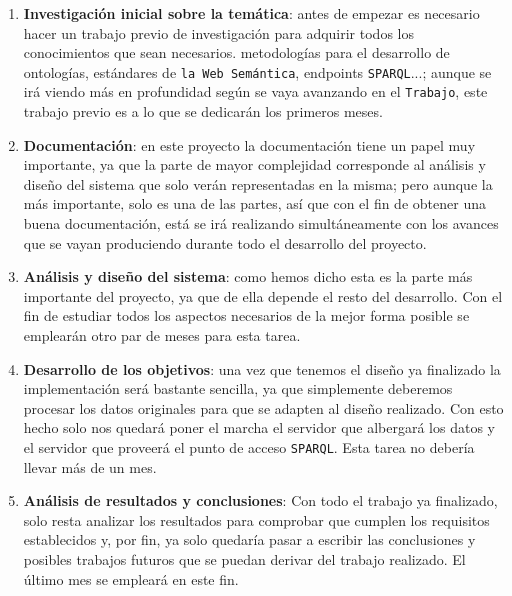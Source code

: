\begin{enumerate}
	\item \textbf{Investigación inicial sobre la temática}: antes de empezar es necesario hacer un trabajo previo de investigación para adquirir todos los conocimientos que sean necesarios. metodologías para el desarrollo de ontologías, estándares de {\tt la Web Semántica}, endpoints {\tt SPARQL}...; aunque se irá viendo más en profundidad según se vaya avanzando en el {\tt Trabajo}, este trabajo previo es a lo que se dedicarán los primeros meses.
	\item \textbf{Documentación}: en este proyecto la documentación tiene un papel muy importante, ya que la parte de mayor complejidad corresponde al análisis y diseño del sistema que solo verán representadas en la misma; pero aunque la más importante, solo es una de las partes, así que con el fin de obtener una buena documentación, está se irá realizando simultáneamente con los avances que se vayan produciendo durante todo el desarrollo del proyecto.
	\item \textbf{Análisis y diseño del sistema}: como hemos dicho esta es la parte más importante del proyecto, ya que de ella depende el resto del desarrollo. Con el fin de estudiar todos los aspectos necesarios de la mejor forma posible se emplearán otro par de meses para esta tarea.
	\newpage
	\item \textbf{Desarrollo de los objetivos}: una vez que tenemos el diseño ya finalizado la implementación será bastante sencilla, ya que simplemente deberemos procesar los datos originales para que se adapten al diseño realizado. Con esto hecho solo nos quedará poner el marcha el servidor que albergará los datos y el servidor que proveerá el punto de acceso {\tt SPARQL}. Esta tarea no debería llevar más de un mes.
	\item \textbf{Análisis de resultados y conclusiones}: Con todo el trabajo ya finalizado, solo resta analizar los resultados para comprobar que cumplen los requisitos establecidos y, por fin, ya solo quedaría pasar a escribir las conclusiones y posibles trabajos futuros que se puedan derivar del trabajo realizado. El último mes se empleará en este fin.
\end{enumerate}